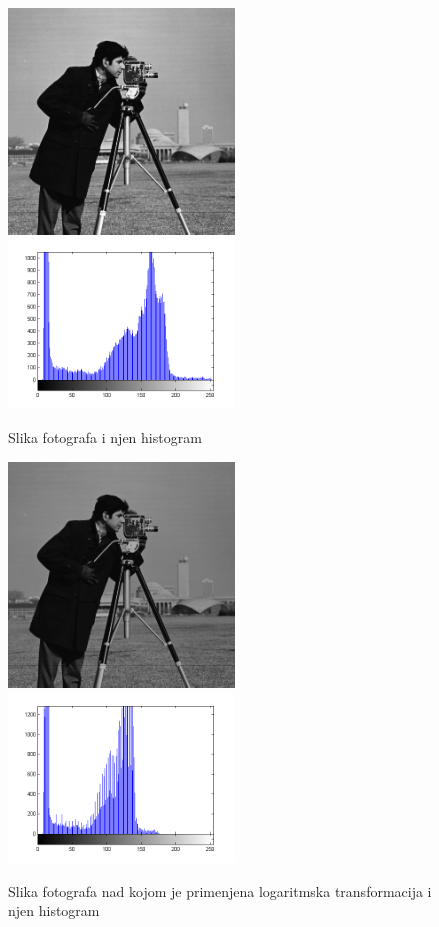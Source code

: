 \documentclass[a4paper,12pt,titlepage]{article}
\begin{document}
\begin{figure}[ht!]
\centering
\includegraphics[width=60mm]{img/img.png}
\includegraphics[width=60mm]{img/histImg.png}
\caption{Slika fotografa i njen histogram}
\label{hist1}
\end{figure} 

\begin{figure}[ht!]
\centering
\includegraphics[width=60mm]{img/imgLog.png}
\includegraphics[width=60mm]{img/histImgLog.png}
\caption{Slika fotografa nad kojom je primenjena logaritmska transformacija i njen histogram}
\label{hist2}
\end{figure} 
\end{document}
